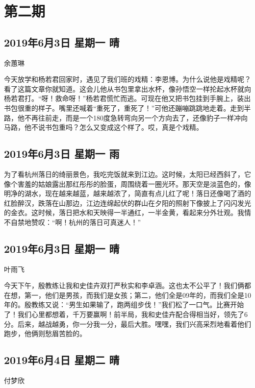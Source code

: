 \chapter{第二期}

\section{2019年6月3日 星期一 晴}

余蕙琳

今天放学和杨若君回家时，遇见了我们班的戏精：李恩博。为什么说他是戏精呢？看了这篇文章你就知道。这会儿他从书包里拿出水杯，像孙悟空一样抡起水杯就向杨若君打。``呀！救命呀！''杨若君慌忙而逃。可现在他又把书包挂到手腕上，装出书包很重的样子。嘴里还喊着``重死了，重死了！''可他还蹦嘣跳跳地走着。走到半路，他不再往前走，而是一个180度急转弯向另一个方向去了，还像豹子一样冲向马路，他不说书包重吗？怎么又变成这个样了。哎，真是个戏精。

\section{2019年6月3日 星期一 雨}

为了看杭州落日的绮丽景色，我吃完饭就来到江边。这时候，太阳已经西斜了，它像个害羞的姑娘露出那红彤彤的脸蛋，周围绕着一圈光环。那天空是淡蓝色的，像明净的湖水，现在越来越蓝，越来越浓了，简直有点儿红了呢！落日还像喝了酒的红脸醉汉，跌落在山那边，江边连绵起伏的群山在夕阳的照射下像披上了闪闪发光的金衣。这时候，落日把水和天映得一半通红，一半金黄，看起来分外壮观。我情不自禁地赞叹：``啊！杭州的落日可真迷人！''

\section{2019年6月3日 星期一 晴}

叶雨飞

今天下午，殷教练让我和史佳卉双打严秋实和李卓涵。这也太不公平了！我们俩都在想，第一，他们是男孩，而我们是女孩；第二，他们全是09年的，而我们全是10年的。殷教练又说：``男生如果输了，跑两组步伐！''我们松了一口气。比赛开始了！我们心里都想着，千万要赢啊！前半局，我和史佳卉配合得相当好，领先了6分。后来，越战越勇，你一分我一分，最后大胜。嘿嘿，我们兴高采烈地看着他们跑步，他俩则愁眉苦脸的。

\section{2019年6月4日 星期二 晴}

付梦欣

